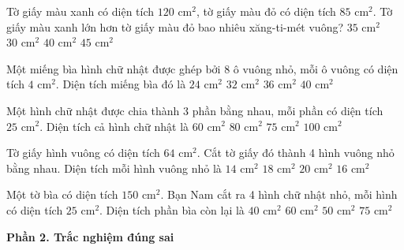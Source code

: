 \begin{ex} %
Tờ giấy màu xanh có diện tích $120\text{ cm}^2$, tờ giấy màu đỏ có diện tích $85\text{ cm}^2$. Tờ giấy màu xanh lớn hơn tờ giấy màu đỏ bao nhiêu xăng-ti-mét vuông?
\choice
{\True $35\text{ cm}^2$}
{$30\text{ cm}^2$}
{$40\text{ cm}^2$}
{$45\text{ cm}^2$}
\end{ex}

\begin{ex} %
Một miếng bìa hình chữ nhật được ghép bởi 8 ô vuông nhỏ, mỗi ô vuông có diện tích $4\text{ cm}^2$. Diện tích miếng bìa đó là
\choice
{$24\text{ cm}^2$}
{\True $32\text{ cm}^2$}
{$36\text{ cm}^2$}
{$40\text{ cm}^2$}
\end{ex}

\begin{ex} %
Một hình chữ nhật được chia thành 3 phần bằng nhau, mỗi phần có diện tích $25\text{ cm}^2$. Diện tích cả hình chữ nhật là
\choice
{$60\text{ cm}^2$}
{$80\text{ cm}^2$}
{\True $75\text{ cm}^2$}
{$100\text{ cm}^2$}
\end{ex}

\begin{ex} %
Tờ giấy hình vuông có diện tích $64\text{ cm}^2$. Cắt tờ giấy đó thành 4 hình vuông nhỏ bằng nhau. Diện tích mỗi hình vuông nhỏ là
\choice
{$14\text{ cm}^2$}
{$18\text{ cm}^2$}
{$20\text{ cm}^2$}
{\True $16\text{ cm}^2$}
\end{ex}

\begin{ex} %
Một tờ bìa có diện tích $150\text{ cm}^2$. Bạn Nam cắt ra 4 hình chữ nhật nhỏ, mỗi hình có diện tích $25\text{ cm}^2$. Diện tích phần bìa còn lại là
\choice
{$40\text{ cm}^2$}
{$60\text{ cm}^2$}
{\True $50\text{ cm}^2$}
{$75\text{ cm}^2$}
\end{ex}

\textbf{Phần 2. Trắc nghiệm đúng sai}

